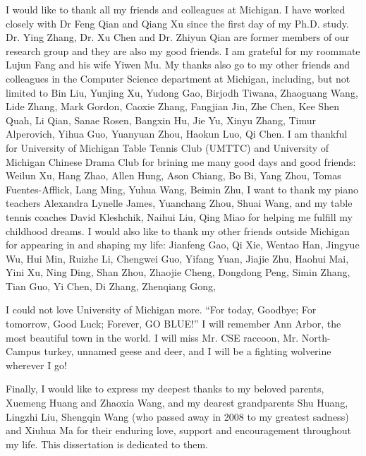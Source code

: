 I would like to thank all my friends and colleagues at Michigan. I have worked closely with Dr Feng Qian and Qiang Xu since the first day of my Ph.D. study. Dr. Ying Zhang, Dr. Xu Chen and Dr. Zhiyun Qian are former members of our research group and they are also my good friends. I am grateful for my roommate Lujun Fang and his wife Yiwen Mu. My thanks also go to my other friends and colleagues in the Computer Science department at Michigan, including, but not limited to Bin Liu, Yunjing Xu, Yudong Gao, Birjodh Tiwana, Zhaoguang Wang, Lide Zhang, Mark Gordon, Caoxie Zhang, Fangjian Jin, Zhe Chen, Kee Shen Quah, Li Qian, Sanae Rosen, Bangxin Hu, Jie Yu, Xinyu Zhang, Timur Alperovich, Yihua Guo, Yuanyuan Zhou, Haokun Luo, Qi Chen. I am thankful for University of Michigan Table Tennis Club (UMTTC) and University of Michigan Chinese Drama Club for brining me many good days and good friends: Weilun Xu, Hang Zhao, Allen Hung, Ason Chiang, Bo Bi, Yang Zhou, Tomas Fuentes-Afflick, Lang Ming, Yuhua Wang, Beimin Zhu, \etc I want to thank my piano teachers Alexandra Lynelle James, Yuanchang Zhou, Shuai Wang, and my table tennis coaches David Kleshchik, Naihui Liu, Qing Miao for helping me fulfill my childhood dreams. I would also like to thank my other friends outside Michigan for appearing in and shaping my life: Jianfeng Gao, Qi Xie, Wentao Han, Jingyue Wu, Hui Min, Ruizhe Li, Chengwei Guo, Yifang Yuan, Jiajie Zhu, Haohui Mai, Yini Xu, Ning Ding, Shan Zhou, Zhaojie Cheng, Dongdong Peng, Simin Zhang, Tian Guo, Yi Chen, Di Zhang, Zhenqiang Gong, \etc

I could not love University of Michigan more. ``For today, Goodbye; For tomorrow, Good Luck; Forever, GO BLUE!'' I will remember Ann Arbor, the most beautiful town in the world. I will miss Mr. CSE raccoon, Mr. North-Campus turkey, unnamed geese and deer, and I will be a fighting wolverine wherever I go!

Finally, I would like to express my deepest thanks to my beloved parents, Xuemeng Huang and Zhaoxia Wang, and my dearest grandparents Shu Huang, Lingzhi Liu, Shengqin Wang (who passed away in 2008 to my greatest sadness) and Xiuhua Ma for their enduring love, support and encouragement throughout my life. This dissertation is dedicated to them.

\label{ACKNOWLEDGEMENTS}
